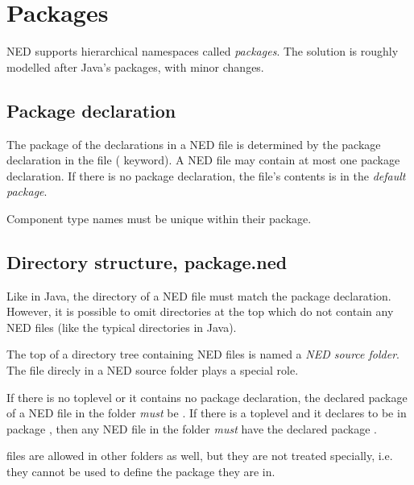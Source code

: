 \section{Packages}
\label{ch-ned-ref:sec:packages}

NED supports hierarchical namespaces called \textit{packages}. The solution
is roughly modelled after Java's packages, with minor changes.


\subsection{Package declaration}

The package of the declarations in a NED file is determined by the package
declaration in the file ( keyword). A NED file may contain at
most one package declaration. If there is no package declaration, the file's
contents is in the \textit{default package}.

Component type names must be unique within their package.


\subsection{Directory structure, package.ned}

Like in Java, the directory of a NED file must match the package
declaration. However, it is possible to omit directories at the top which do
not contain any NED files (like the typical 
directories in Java).

The top of a directory tree containing NED files is named a \textit{NED source
folder}. The  file direcly in a NED source folder plays a
special role.

If there is no toplevel  or it contains no package declaration,
the declared package of a NED file in the folder 
\textit{must} be .
If there is a toplevel  and it declares to be in package
, then any NED file in the folder 
\textit{must} have the declared package .

\begin{note}
     files are allowed in other folders as well, but they
    are not treated specially, i.e. they cannot be used to define the package
    they are in.
\end{note}




